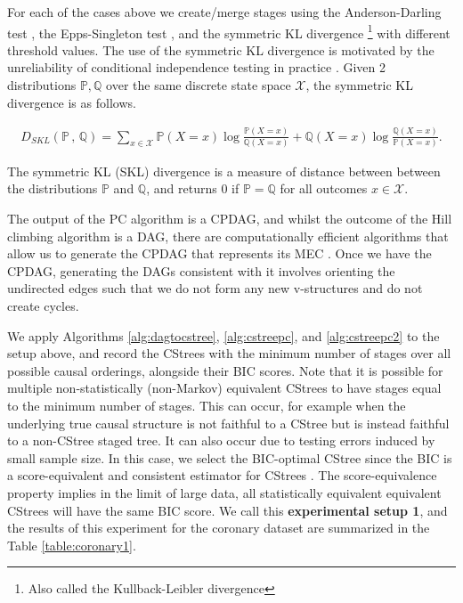 \documentclass{tufte-book}
\begin{document}
For each of the cases above we create/merge stages using the Anderson-Darling test \cite{scholz-1987-k-sampl}, the Epps-Singleton test \cite{epps-1986-omnib-test}, and the symmetric KL divergence  \footnote{Also called the Kullback-Leibler divergence}  with different threshold values. The use of the symmetric KL divergence is motivated by the unreliability of conditional independence testing in practice \cite{shah-2020-hardn-condit}. Given 2 distributions \(\mathbb{P}, \mathbb{Q}\) over the same discrete state space \(\mathcal{X}\), the symmetric KL divergence is as follows. 



\begin{align*}
D_{SKL}(\mathbb{P} \, , \, \mathbb{Q}) = \sum_{x \in \mathcal{X}} \mathbb{P}(X=x)\log \frac{\mathbb{P}(X = x)}{\mathbb{Q}(X=x)} + \mathbb{Q}(X=x)\log \frac{\mathbb{Q}(X = x)}{\mathbb{P}(X=x)}.
\end{align*}

The symmetric KL (SKL) divergence is a measure of distance between between the distributions \(\mathbb{P}\) and \(\mathbb{Q}\), and returns \(0\) if \(\mathbb{P}=\mathbb{Q}\) for all outcomes \(x \in \mathcal{X}\).


The output of the PC algorithm is a CPDAG, and whilst the outcome of the Hill climbing algorithm is a DAG, there are computationally efficient algorithms that allow us to generate the CPDAG that represents its MEC \cite{chickering-2002-learn-equiv}. Once we have the CPDAG, generating the DAGs consistent with it involves orienting the undirected edges such that we do not form any new v-structures and do not create cycles. 


We apply Algorithms \ref{alg:dagtocstree}, \ref{alg:cstreepc}, and \ref{alg:cstreepc2} to the setup above, and record the CStrees with the minimum number of stages over all possible causal orderings, alongside their BIC scores. Note that it is possible for multiple non-statistically (non-Markov) equivalent CStrees to have stages equal to the minimum number of stages. This can occur, for example when the underlying true causal structure is not faithful to a CStree but is instead faithful to a non-CStree staged tree. It can also occur due to testing errors induced by small sample size. In this case, we select the BIC-optimal CStree since the BIC is a score-equivalent and consistent estimator for CStrees \cite{duarte-2021-repres-contex}. The score-equivalence property implies in the limit of large data, all statistically equivalent equivalent CStrees will have the same BIC score. We call this \textbf{experimental setup 1}, and the results of this experiment for the coronary dataset are summarized in the Table \ref{table:coronary1}.
\end{document}
